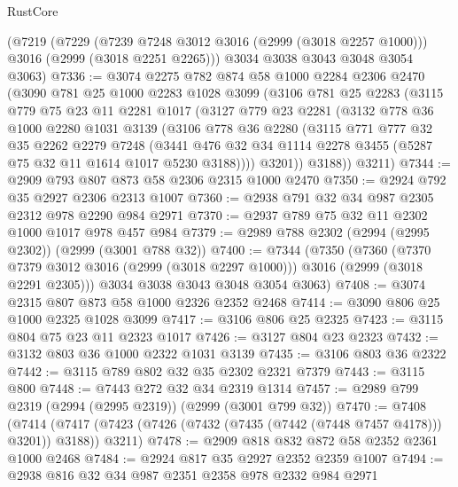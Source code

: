 \begin{lexlean}{RustCore}
\begin{coremodule}
    (@7219
      (@7229
        (@7239 @7248 @3012 @3016 (@2999 (@3018 @2257 @1000)))
        @3016
        (@2999 (@3018 @2251 @2265)))
      @3034
      @3038
      @3043
      @3048
      @3054
      @3063)
@7336 := @3074
    @2275
    @782
    @874
    @58
    @1000
    @2284
    @2306
    @2470
    (@3090
      @781
      @25
      @1000
      @2283
      @1028
      @3099
      (@3106
        @781
        @25
        @2283
        (@3115
          @779
          @75
          @23
          @11
          @2281
          @1017
          (@3127
            @779
            @23
            @2281
            (@3132
              @778
              @36
              @1000
              @2280
              @1031
              @3139
              (@3106
                @778
                @36
                @2280
                (@3115
                  @771
                  @777
                  @32
                  @35
                  @2262
                  @2279
                  @7248
                  (@3441
                    @476
                    @32
                    @34
                    @1114
                    @2278
                    @3455
                    (@5287 @75 @32 @11 @1614 @1017 @5230 @3188))))
              @3201))
          @3188))
      @3211)
@7344 := @2909 @793 @807 @873 @58 @2306 @2315 @1000 @2470
@7350 := @2924 @792 @35 @2927 @2306 @2313 @1007
@7360 := @2938 @791 @32 @34 @987 @2305 @2312 @978 @2290 @984 @2971
@7370 := @2937 @789 @75 @32 @11 @2302 @1000 @1017 @978 @457 @984
@7379 := @2989 @788 @2302 (@2994 (@2995 @2302)) (@2999 (@3001 @788 @32))
@7400 := @7344
    (@7350
      (@7360
        (@7370 @7379 @3012 @3016 (@2999 (@3018 @2297 @1000)))
        @3016
        (@2999 (@3018 @2291 @2305)))
      @3034
      @3038
      @3043
      @3048
      @3054
      @3063)
@7408 := @3074 @2315 @807 @873 @58 @1000 @2326 @2352 @2468
@7414 := @3090 @806 @25 @1000 @2325 @1028 @3099
@7417 := @3106 @806 @25 @2325
@7423 := @3115 @804 @75 @23 @11 @2323 @1017
@7426 := @3127 @804 @23 @2323
@7432 := @3132 @803 @36 @1000 @2322 @1031 @3139
@7435 := @3106 @803 @36 @2322
@7442 := @3115 @789 @802 @32 @35 @2302 @2321 @7379
@7443 := @3115 @800
@7448 := @7443 @272 @32 @34 @2319 @1314
@7457 := @2989 @799 @2319 (@2994 (@2995 @2319)) (@2999 (@3001 @799 @32))
@7470 := @7408
    (@7414 (@7417 (@7423 (@7426 (@7432 (@7435 (@7442 (@7448 @7457 @4178))) @3201)) @3188)) @3211)
@7478 := @2909 @818 @832 @872 @58 @2352 @2361 @1000 @2468
@7484 := @2924 @817 @35 @2927 @2352 @2359 @1007
@7494 := @2938 @816 @32 @34 @987 @2351 @2358 @978 @2332 @984 @2971

\end{coremodule}
\end{lexlean}

